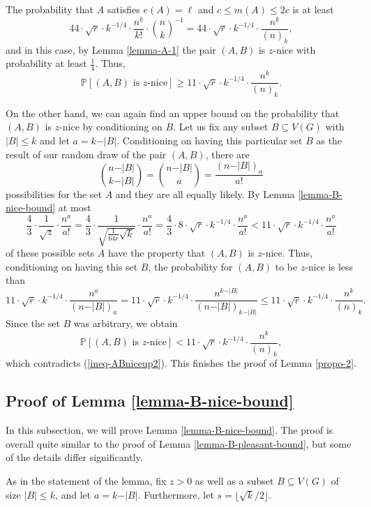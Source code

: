 \documentclass[11pt]{article}
\theoremstyle{definition}
\numberwithin{equation}{section}
\begin{document}
The probability that $A$ satisfies $e(A)=\ell$ and $c\leq m(A)\leq 2c$ is at least
\[44\cdot \sqrt{r}\cdot k^{-1/4}\cdot \frac{n^k}{k!}\cdot {n\choose k}^{-1}=44\cdot \sqrt{r}\cdot k^{-1/4}\cdot\frac{n^k}{(n)_k},\]
and in this case, by Lemma \ref{lemma-A-1} the pair $(A,B)$ is $z$-nice with probability at least $\frac{1}{4}$. Thus, 
\begin{equation}\label{ineq-ABniceup2}
\mathbb{P}[(A,B)\text{ is }z\text{-nice}]\geq 11\cdot \sqrt{r}\cdot k^{-1/4}\cdot\frac{n^k}{(n)_k}.
\end{equation}

On the other hand, we can again find an upper bound on the probability that $(A,B)$ is $z$-nice by conditioning on $B$. Let us fix any subset $B\subseteq V(G)$ with $\vert B\vert \leq k$ and let $a=k-\vert B\vert$. Conditioning on having this particular set $B$ as the result of our random draw of the pair $(A,B)$, there are
\[{n-\vert B\vert\choose k-\vert B\vert}={n-\vert B\vert\choose a}=\frac{(n-\vert B\vert)_a}{a!}\]
possibilities for the set $A$ and they are all equally likely. By Lemma \ref{lemma-B-nice-bound} at most
\[\frac{4}{3}\cdot\frac{1}{\sqrt{z}}\cdot \frac{n^a}{a!}=\frac{4}{3}\cdot\frac{1}{\sqrt{\frac{1}{64r}\sqrt{k}}}\cdot \frac{n^a}{a!}= \frac{4}{3}\cdot 8\cdot \sqrt{r}\cdot k^{-1/4}\cdot \frac{n^a}{a!}<11\cdot \sqrt{r}\cdot k^{-1/4}\cdot \frac{n^a}{a!}\]
of these possible sets $A$ have the property that $(A,B)$ is $z$-nice. Thus, conditioning on having this set $B$, the probability for $(A,B)$ to be $z$-nice is less than
\[11\cdot \sqrt{r}\cdot k^{-1/4}\cdot \frac{n^a}{(n-\vert B\vert)_a}
=11\cdot \sqrt{r}\cdot k^{-1/4}\cdot \frac{n^{k-\vert B\vert}}{(n-\vert B\vert)_{k-\vert B\vert}}\leq 11\cdot \sqrt{r}\cdot k^{-1/4}\cdot \frac{n^k}{(n)_k}.\]
Since the set $B$ was arbitrary, we obtain
\[\mathbb{P}[(A,B)\text{ is }z\text{-nice}]<11\cdot \sqrt{r}\cdot k^{-1/4}\cdot \frac{n^k}{(n)_k},\]
which contradicts (\ref{ineq-ABniceup2}). This finishes the proof of Lemma \ref{propo-2}.

\subsection{Proof of Lemma \ref{lemma-B-nice-bound}}\label{subsect-lemma-proof}

In this subsection, we will prove Lemma \ref{lemma-B-nice-bound}. The proof is overall quite similar to the proof of Lemma \ref{lemma-B-pleasant-bound}, but some of the details differ significantly.

As in the statement of the lemma, fix $z>0$ as well as a subset $B\subseteq V(G)$ of size $\vert B\vert\leq k$, and let $a=k-\vert B\vert$. Furthermore, let $s=\lfloor \sqrt{k}/2\rfloor$. 
\end{document}
